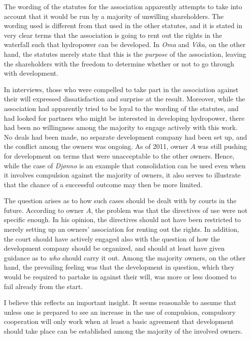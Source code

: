 The wording of the statutes for the association apparently attempts to take into account that it would be run by a majority of unwilling shareholders. The wording used is different from that used in the other statutes, and it is stated in very clear terms that the association is going to rent out the rights in the waterfall such that hydropower can be developed. In \emph{Oma} and \emph{Vika}, on the other hand, the statutes merely state that this is the \emph{purpose} of the association, leaving the shareholders with the freedom to determine whether or not to go through with development.

In interviews, those who were compelled to take part in the association against their will expressed dissatisfaction and surprise at the result. Moreover, while the association had apparently tried to be loyal to the wording of the statutes, and had looked for partners who might be interested in developing hydropower, there had been no willingness among the majority to engage actively with this work. No deals had been made, no separate development company had been set up, and the conflict among the owners was ongoing. As of 2011, owner $A$ was still pushing for development on terms that were unacceptable to the other owners. Hence, while the case of \emph{Djønno} is an example that consolidation can be used even when it involves compulsion against the majority of owners, it also serves to illustrate that the chance of a successful outcome may then be more limited.

The question arises as to how such cases should be dealt with by courts in the future. According to owner $A$, the problem was that the directives of use were not specific enough. In his opinion, the directives should not have been restricted to merely setting up an owners' association for renting out the rights. In addition, the court should have actively engaged also with the question of how the development company should be organized, and should at least have given guidance as to \emph{who} should carry it out. Among the majority owners, on the other hand, the prevailing feeling was that the development in question, which they would be required to partake in against their will, was more or less doomed to fail already from the start.

I believe this reflects an important insight. It seems reasonable to assume that unless one is prepared to see an increase in the use of compulsion, compulsory cooperation will only work when at least a basic agreement that development should take place can be established among the majority of the involved owners.

